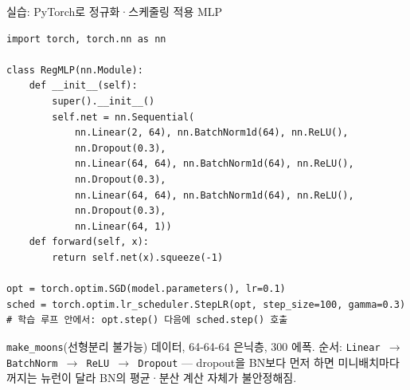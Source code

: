 \begin{frame}[fragile,shrink=6]{실습: PyTorch로 정규화·스케줄링 적용 MLP}
\begin{lstlisting}
import torch, torch.nn as nn

class RegMLP(nn.Module):
    def __init__(self):
        super().__init__()
        self.net = nn.Sequential(
            nn.Linear(2, 64), nn.BatchNorm1d(64), nn.ReLU(),
            nn.Dropout(0.3),
            nn.Linear(64, 64), nn.BatchNorm1d(64), nn.ReLU(),
            nn.Dropout(0.3),
            nn.Linear(64, 64), nn.BatchNorm1d(64), nn.ReLU(),
            nn.Dropout(0.3),
            nn.Linear(64, 1))
    def forward(self, x):
        return self.net(x).squeeze(-1)

opt = torch.optim.SGD(model.parameters(), lr=0.1)
sched = torch.optim.lr_scheduler.StepLR(opt, step_size=100, gamma=0.3)
# 학습 루프 안에서: opt.step() 다음에 sched.step() 호출
\end{lstlisting}
  {\footnotesize \texttt{make\_moons}(선형분리 불가능) 데이터,
  64-64-64 은닉층, 300 에폭. 순서: \texttt{Linear $\to$ BatchNorm
  $\to$ ReLU $\to$ Dropout} — dropout을 BN보다 먼저 하면 미니배치마다
  꺼지는 뉴런이 달라 BN의 평균·분산 계산 자체가 불안정해짐.}
\end{frame}
